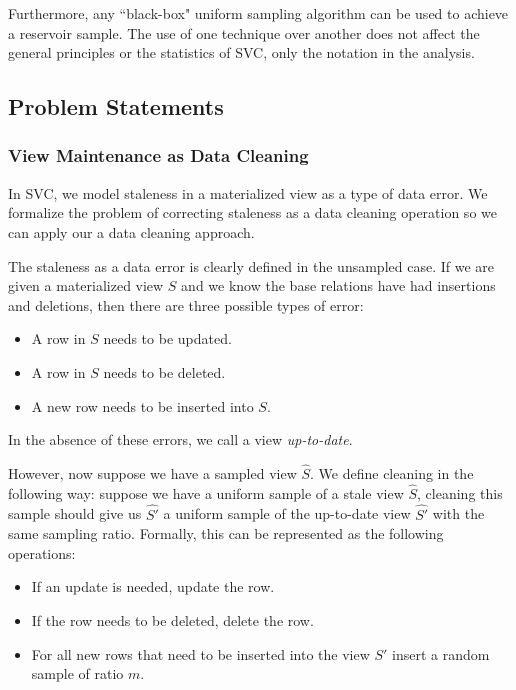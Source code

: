 Furthermore, any ``black-box" uniform sampling algorithm can be used to achieve a reservoir sample.
The use of one technique over another does not affect the general principles or the statistics of SVC, only the 
notation in the analysis.
\fi

\subsection{Problem Statements}
\subsubsection{View Maintenance as Data Cleaning}
In SVC, we model staleness in a materialized view as a type of data error.
We formalize the problem of correcting staleness as a data cleaning operation so we can apply our a data cleaning approach.

The staleness as a data error is clearly defined in the unsampled case.
If we are given a materialized view $S$ and we know the base relations have had insertions and deletions, then there are three possible types of error:
\begin{itemize}[noitemsep]
\item A row in $S$ needs to be updated.
\item A row in $S$ needs to be deleted.
\item A new row needs to be inserted into $S$.
\end{itemize}
In the absence of these errors, we call a view \emph{up-to-date}.

However, now suppose we have a sampled view $\hat{S}$.
We define cleaning in the following way: suppose we have a uniform sample of a stale view $\hat{S}$, cleaning this sample
should give us $\hat{S'}$ a uniform sample of the up-to-date view $\hat{S'}$ with the same sampling ratio.
Formally, this can be represented as the following operations:
\begin{itemize}[noitemsep]
\item If an update is needed, update the row.
\item If the row needs to be deleted, delete the row.
\item For all new rows that need to be inserted into the view $S'$ insert a random sample of ratio $m$.
\end{itemize}

